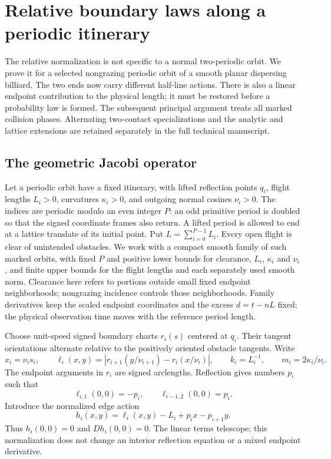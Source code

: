 \section{Relative boundary laws along a periodic itinerary}
\label{sec:v64-periodic-itinerary}

The relative normalization is not specific to a normal two-periodic
orbit.  We prove it for a selected nongrazing periodic orbit of a smooth
planar dispersing billiard.  The two ends now carry different half-line
actions.  There is also a linear endpoint contribution to the physical
length; it must be restored before a probability law is formed.
The subsequent principal argument treats all marked collision phases.
Alternating two-contact specializations and the analytic and lattice
extensions are retained separately in the full technical manuscript.

\subsection{The geometric Jacobi operator}

Let a periodic orbit have a fixed itinerary, with lifted reflection points
$q_i$, flight lengths $L_i>0$, curvatures $\kappa_i>0$, and outgoing
normal cosines $\nu_i>0$.  The indices are periodic modulo an even
integer $P$: an odd primitive period is doubled so that the signed
coordinate frames also return.  A lifted period is allowed to end at a
lattice translate of its initial point.  Put $L=\sum_{i=0}^{P-1}L_i$.
Every open flight is clear of unintended obstacles.  We work with a
compact smooth family of such marked orbits, with fixed $P$ and positive
lower bounds for clearance, $L_i$, $\kappa_i$ and $\nu_i$, and finite
upper bounds for the flight lengths and each separately used smooth norm.
Clearance here refers to portions outside small fixed endpoint
neighborhoods; nongrazing incidence controls those neighborhoods.
Family derivatives keep the scaled endpoint coordinates and the excess
$d=t-nL$ fixed; the physical observation time moves with the reference
period length.

Choose unit-speed signed boundary charts $r_i(s)$ centered at $q_i$.
Their tangent orientations alternate relative to the positively oriented
obstacle tangents.  Write
\[
 x_i=\nu_i s_i,\qquad
 \ell_i(x,y)=|r_{i+1}(y/\nu_{i+1})-r_i(x/\nu_i)|,
 \qquad k_i=L_i^{-1},\qquad m_i=2\kappa_i/\nu_i.
\]
The endpoint arguments in $r_i$ are signed arclengths.  Reflection gives
numbers $p_i$ such that
\[
 \ell_{i,1}(0,0)=-p_i,\qquad \ell_{i-1,2}(0,0)=p_i.
\]
Introduce the normalized edge action
\begin{equation}\label{eq:v64-edge-gauge}
 h_i(x,y)=\ell_i(x,y)-L_i+p_i x-p_{i+1}y.
\end{equation}
Thus $h_i(0,0)=0$ and $Dh_i(0,0)=0$.  The linear terms telescope;
this normalization does not change an interior reflection equation or
a mixed endpoint derivative.

